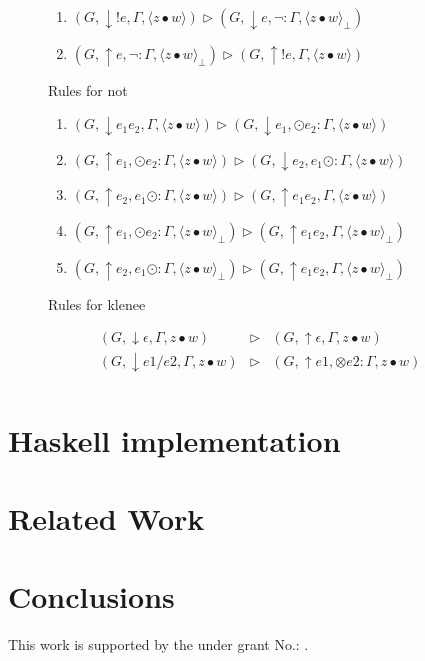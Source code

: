 \documentclass[manuscript, review, sigconf]{acmart}
\newcommand{\zpp}[2]{\langle #1\bullet #2 \rangle}
\newcommand{\zppf}[2]{\langle #1\bullet #2 \rangle_{\bot}}
\begin{document}
\begin{figure}[H]
\begin{enumerate}\addtocounter{enumi}{9}
  \item \label{r090} $(G, \downarrow ! e,\Gamma ,\zpp{z}{w})       \rhd  (G, \downarrow e, \neg : \Gamma, \zppf{z}{w})$ 
  \item \label{r100} $(G, \uparrow e , \neg : \Gamma ,\zppf{z}{w}) \rhd  (G, \uparrow !e,  \Gamma, \zpp{z}{w})$ 
 
\end{enumerate}
 \caption{Rules for not}
 \label{fig:rule-seq}
\end{figure}



\begin{figure}[H]
\begin{enumerate}\addtocounter{enumi}{9}
  \item \label{r090} $(G, \downarrow e_1e_2,\Gamma ,\zpp{z}{w})    \rhd  (G, \downarrow e_1,  \odot e_2 : \Gamma, \zpp{z}{w})$ 
  \item \label{r100} $(G, \uparrow e_1 ,\odot e_2 : \Gamma ,\zpp{z}{w})   \rhd  (G, \downarrow e_2, e_1 \odot : \Gamma, \zpp{z}{w})$ 
  \item \label{r110} $(G, \uparrow e_2 ,e_1 \odot  : \Gamma ,\zpp{z}{w})   \rhd  (G, \uparrow e_1e_2, \Gamma, \zpp{z}{w})$
  \item \label{r120} $(G, \uparrow e_1 ,  \odot e_2 : \Gamma ,\zppf{z}{w})   \rhd  (G, \uparrow e_1 e_2, \Gamma, \zppf{z}{w})$ 
  \item \label{r130} $(G, \uparrow e_2 ,e_1 \odot  : \Gamma ,\zppf{z}{w})   \rhd  (G, \uparrow e_1e_2, \Gamma, \zppf{z}{w})$
\end{enumerate}
 \caption{Rules for klenee}
 \label{fig:rule-seq}
\end{figure}


\[
\begin{array}{lcl} 
 (G, \downarrow \epsilon,\Gamma ,z \bullet w) & \rhd & (G, \uparrow \epsilon, \Gamma, z \bullet w) \\
 (G, \downarrow e1/e2, \Gamma ,z \bullet w)   & \rhd & (G, \uparrow e1, \otimes e2 : \Gamma, z \bullet w) \\
\end{array}
\]

\section{Haskell implementation}

\section{Related Work} \label{sec:related}


\section{Conclusions} \label{sec:conc}


\begin{acks}
This work is supported by the  under grant No.: .
\end{acks}




\end{document}
